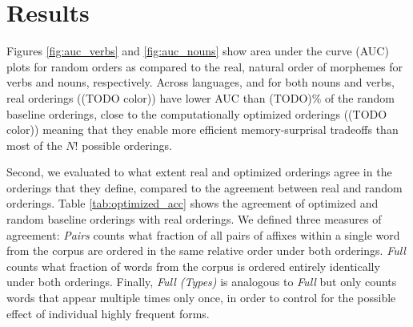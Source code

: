 \documentclass[11pt,letterpaper]{article}
\newcommand{\citet}{\Textcite}
\newcommand\mhahn[1]{{\color{red}(#1)}}
\newcommand\becky[1]{{\color{blue}(#1)}}
\newcounter{def}
\begin{document}



\section{Results}
Figures \ref{fig:auc_verbs} and \ref{fig:auc_nouns} show area under the curve (AUC) plots for random orders as compared to the real, natural order of morphemes for verbs and nouns, respectively.
Across languages, and for both nouns and verbs, real orderings \mhahn{(TODO color)} have lower AUC than \mhahn{TODO}\% of the random baseline orderings, close to the computationally optimized orderings \mhahn{(TODO color)} meaning that they enable more efficient memory-surprisal tradeoffs than most of the $N!$ possible orderings. 

Second, we evaluated to what extent real and optimized orderings agree in the orderings that they define, compared to the agreement between real and random orderings.
Table \ref{tab:optimized_acc} shows the agreement of optimized and random baseline orderings with real orderings.
We defined three measures of agreement:
\textit{Pairs} counts what fraction of all pairs of affixes within a single word from the corpus are ordered in the same relative order under both orderings.
\textit{Full} counts what fraction of words from the corpus is ordered entirely identically under both orderings.
Finally, \textit{Full (Types)} is analogous to \textit{Full} but only counts words that appear multiple times only once, in order to control for the possible effect of individual highly frequent forms.
\end{document}
